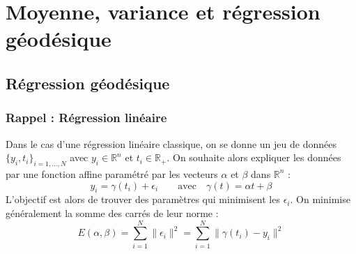 \newcommand{\R}{\mathbb{R}}
\newcommand{\M}{\mathbb{M}}
\newcommand{\syst}[2]{\left\{ \begin{array}{#1} #2 \end{array} \right.}
\newcommand{\trans}{\mathsf{T}}
\newcommand{\ind}{\mathbbm{1}}




\chapter{Moyenne, variance et régression géodésique}
\label{chap:stats}

\section{Régression géodésique}
\label{sec:Regression}

\subsection{Rappel : Régression linéaire}
\label{subsec:RegLin}

Dans le cas d'une régression linéaire classique, on se donne un jeu de données $\{ y_i, t_i \}_{i = 1, ..., N}$ avec $y_i \in \R^n$ et $t_i \in \R_+$. On souhaite alors expliquer les données par une fonction affine paramétré par les vecteurs $\alpha$ et $\beta$ dans $\R^n$ :
\begin{equation}
	\label{eq:RegLin}
	y_i = \gamma(t_i) + \epsilon_i \qquad \text{avec} \quad \gamma(t) = \alpha t + \beta
\end{equation}
L'objectif est alors de trouver des paramètres qui minimisent les $\epsilon_i$. On minimise généralement la somme des carrés de leur norme :
\begin{equation}
	E(\alpha, \beta) = \sum_{i=1}^N \| \epsilon_i \|^2 = \sum_{i=1}^N \| \gamma(t_i) - y_i \|^2
\end{equation}

